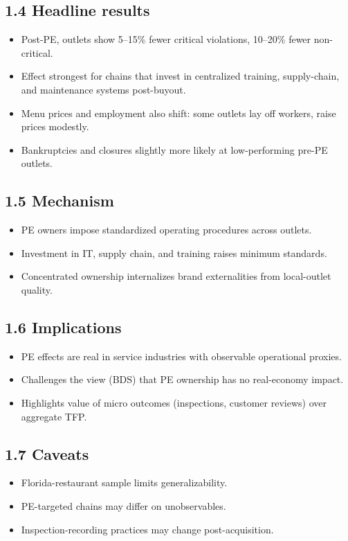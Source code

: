 \documentclass[11pt]{article}
\begin{document}
\subsection*{1.4 Headline results}
\begin{itemize}
\item Post-PE, outlets show 5--15\% fewer critical violations, 10--20\% fewer non-critical.
\item Effect strongest for chains that invest in centralized training, supply-chain, and maintenance systems post-buyout.
\item Menu prices and employment also shift: some outlets lay off workers, raise prices modestly.
\item Bankruptcies and closures slightly more likely at low-performing pre-PE outlets.
\end{itemize}

\subsection*{1.5 Mechanism}
\begin{itemize}
\item PE owners impose standardized operating procedures across outlets.
\item Investment in IT, supply chain, and training raises minimum standards.
\item Concentrated ownership internalizes brand externalities from local-outlet quality.
\end{itemize}

\subsection*{1.6 Implications}
\begin{itemize}
\item PE effects are real in service industries with observable operational proxies.
\item Challenges the view (BDS) that PE ownership has no real-economy impact.
\item Highlights value of micro outcomes (inspections, customer reviews) over aggregate TFP.
\end{itemize}

\subsection*{1.7 Caveats}
\begin{alertbox}
\begin{itemize}
\item Florida-restaurant sample limits generalizability.
\item PE-targeted chains may differ on unobservables.
\item Inspection-recording practices may change post-acquisition.
\end{itemize}
\end{alertbox}
\end{document}
